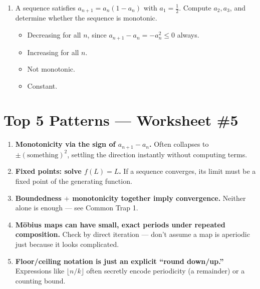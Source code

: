 \documentclass[11pt,a4paper]{article}
\begin{document}
\begin{enumerate}
\item A sequence satisfies $a_{n+1}=a_n(1-a_n)$ with $a_1=\tfrac12$. Compute $a_2,a_3$, and determine whether the sequence is monotonic.
\begin{itemize}
\item[A)] Decreasing for all $n$, since $a_{n+1}-a_n=-a_n^2\leq0$ always.
\item[B)] Increasing for all $n$.
\item[C)] Not monotonic.
\item[D)] Constant.
\end{itemize}


\end{enumerate}

\section*{Top 5 Patterns --- Worksheet \#5}
\begin{enumerate}[leftmargin=2em,itemsep=4pt]
  \item \textbf{Monotonicity via the sign of $a_{n+1}-a_n$.} Often collapses to $\pm(\text{something})^2$, settling the direction instantly without computing terms. 
  \item \textbf{Fixed points: solve $f(L)=L$.} If a sequence converges, its limit must be a fixed point of the generating function. 
  \item \textbf{Boundedness $+$ monotonicity together imply convergence.} Neither alone is enough --- see Common Trap 1. 
  \item \textbf{M\"obius maps can have small, exact periods under repeated composition.} Check by direct iteration --- don't assume a map is aperiodic just because it looks complicated. 
  \item \textbf{Floor/ceiling notation is just an explicit ``round down/up.''} Expressions like $\lfloor n/k\rfloor$ often secretly encode periodicity (a remainder) or a counting bound. 
\end{enumerate}
\end{document}
